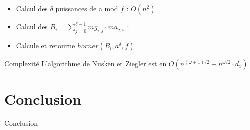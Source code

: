 \documentclass[10pt,a4paper]{beamer}
\begin{document}
\begin{frame}
    \begin{itemize}
        \item Calcul des $\delta$ puissances de a mod $f$ : $\tilde{O}(n^2)$
        \item Calcul des $B_i = \sum_{j=0}^{\delta-1} mg_{i,j}\cdot ma_{j,i}$ : %
        \item Calcule et retourne $horner(B_i, a^{\delta}, f)$
    \end{itemize}
    \begin{alertblock}{Complexité}
        L'algorithme de Nusken et Ziegler est en $O(n^{(\omega+1)/2} + n^{\omega/2}\cdot d_x)$
    \end{alertblock}
\end{frame}

\section{Conclusion}
\begin{frame}{Conclusion}

\end{frame}
\end{document}
